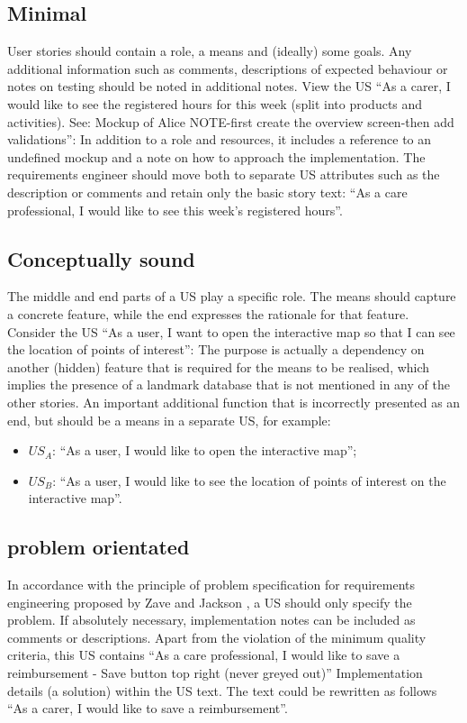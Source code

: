 \subsection*{\normalsize{Minimal}}
User stories should contain a role, a means and (ideally) some goals. Any additional information such as comments, descriptions of expected behaviour or notes on testing should be noted in additional notes. View the US \enquote{As a carer, I would like to see the registered hours for this week (split into products and activities). See: Mockup of Alice NOTE-first create the overview screen-then add validations}: In addition to a role and resources, it includes a reference to an undefined mockup and a note on how to approach the implementation. The requirements engineer should move both to separate US attributes such as the description or comments and retain only the basic story text: \enquote{As a care professional, I would like to see this week's registered hours}.
\subsection*{\normalsize{Conceptually sound}}
The middle and end parts of a US play a specific role. The means should capture a concrete feature, while the end expresses the rationale for that feature. Consider the US \enquote{As a user, I want to open the interactive map so that I can see the location of points of interest}: The purpose is actually a dependency on another (hidden) feature that is required for the means to be realised, which implies the presence of a landmark database that is not mentioned in any of the other stories. An important additional function that is incorrectly presented as an end, but should be a means in a separate US, for example:
\begin{itemize}
\item $US_A$: \enquote{As a user, I would like to open the interactive map};
\item $US_B$: \enquote{As a user, I would like to see the location of points of interest on the interactive map}.
\end{itemize}
\subsection*{\normalsize{problem orientated}}
In accordance with the principle of problem specification for requirements engineering proposed by Zave and Jackson \cite{zave1997four}, a US should only specify the problem. If absolutely necessary, implementation notes can be included as comments or descriptions. Apart from the violation of the minimum quality criteria, this US contains \enquote{As a care professional, I would like to save a reimbursement - Save button top right (never greyed out)} Implementation details (a solution) within the US text. The text could be rewritten as follows \enquote{As a carer, I would like to save a reimbursement}.
